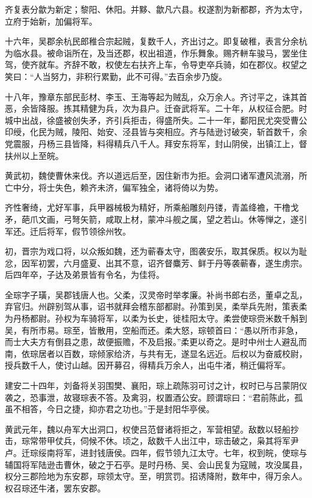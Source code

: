\documentclass[12pt,UTF8]{ctexbook}
\begin{document}
齐复表分歙为新定；黎阳、休阳。并黟、歙凡六县。权遂割为新都郡，齐为太守，立府于始新，加偏将军。

十六年，吴郡余杭民郎稚合宗起贼，复数千人，齐出讨之。即复破稚，表言分余杭为临水县。被命诣所在，及当还郡，权出祖道，作乐舞象。赐齐軿车骏马，罢坐住驾，使齐就车。齐辞不敢，权使左右扶齐上车，令导吏卒兵骑，如在郡仪。权望之笑曰：“人当努力，非积行累勤，此不可得。”去百余步乃旋。

十八年，豫章东部民彭材、李玉、王海等起为贼乱，众万余人。齐讨平之，诛其首恶，余皆降服。拣其精健为兵，次为县户。迁奋武将军。二十年，从权征合肥。时城中出战，徐盛被创失矛，齐引兵拒击，得盛所失。二十一年，鄱阳民尤突受曹公印绶，化民为贼，陵阳、始安、泾县皆与突相应。齐与陆逊讨破突，斩首数千，余党震服，丹杨三县皆降，料得精兵八千人。拜安东将军，封山阴侯，出镇江上，督扶州以上至皖。

黄武初，魏使曹休来伐。齐以道远后至，因住新市为拒。会洞口诸军遭风流溺，所亡中分，将士失色，赖齐未济，偏军独全，诸将倚以为势。

齐性奢绮，尤好军事，兵甲器械极为精好，所乘船雕刻丹镂，青盖绛襜，干橹戈矛，葩爪文画，弓弩矢箭，咸取上材，蒙冲斗舰之属，望之若山。休等惮之，遂引军还。迁后将军，假节领徐州牧。

初，晋宗为戏口将，以众叛如魏，还为蕲春太守，图袭安乐，取其保质。权以为耻忿，因军初罢，六月盛夏、出其不意，诏齐督麋芳、鲜于丹等袭蕲春，遂生虏宗。后四年卒，子达及弟景皆有令名，为佳将。

全琮字子璜，吴郡钱唐人也。父柔，汉灵帝时举孝廉。补尚书郎右丞，董卓之乱，弃官归。州辟别驾从事，诏书就拜会稽东部都尉。孙策到吴，柔举兵先附，策表柔为丹杨都尉。孙权为车骑将军，以柔为长史，徙桂阳太守。柔尝使琮赍米数千斛到吴，有所市易。琮至，皆散用，空船而还。柔大怒，琮顿首曰：“愚以所市非急，而士大夫方有倒县之患，故便振赡，不及启报。”柔更以奇之。是时中州士人避乱而南，依琮居者以百数，琮倾家给济，与共有无，遂显名远近。后权以为奋威校尉，授兵数千人，使讨山越。因开募召，得精兵万余人，出屯牛渚，稍迁偏将军。

建安二十四年，刘备将关羽围樊、襄阳，琮上疏陈羽可讨之计，权时已与吕蒙阴仪袭之，恐事泄，故寝琮表不答。及禽羽，权置酒公安。顾谓琮曰：“君前陈此，孤虽不相答，今日之捷，抑亦君之功也。”于是封阳华亭侯。

黄武元年，魏以舟军大出洞口，权使吕范督诸将拒之，军营相望。敌数以轻船抄击，琮常带甲仗兵，伺候不休。顷之，敌数千人出江中，琮击破之，枭其将军尹卢。迁琮绥南将军，进封钱唐侯。四年，假节领九江太守。七年，权到皖，使琮与辅国将军陆逊击曹休，破之于石亭。是时丹杨、吴、会山民复为寇贼，攻没属县，权分三郡险地为东安郡，琮领太守。至，明赏罚。招诱降附，数年中，得万余人。权召琮还牛渚，罢东安郡。
\end{document}
